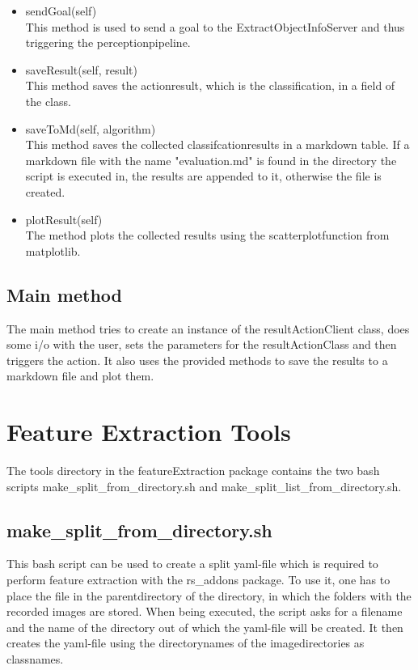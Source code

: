 \documentclass[main.tex]{subfiles}
\begin{document}
\begin{itemize}
\item 
sendGoal(self)\\
This method is used to send a goal to the ExtractObjectInfoServer and thus triggering the perceptionpipeline.

\item saveResult(self, result)\\
This method saves the actionresult, which is the classification, in a field of the class.

\item saveToMd(self, algorithm)\\
This method saves the collected classifcationresults in a markdown table. If a markdown file with the name "evaluation.md" is found in the directory the script is executed in, the results are appended to it, otherwise the file is created.

\item plotResult(self)\\
The method plots the collected results using the scatterplotfunction from matplotlib.
\end{itemize}

\subsection{Main method}
The main method tries to create an instance of the resultActionClient class, does some i/o with the user, sets the parameters for the resultActionClass and then triggers the action. It also uses the provided methods to save the results to a markdown file and plot them.

\section{Feature Extraction Tools}
The tools directory in the featureExtraction package contains the two bash scripts make\_split\_from\_directory.sh and make\_split\_list\_from\_directory.sh.

\subsection{make\_split\_from\_directory.sh} 
This bash script can be used to create a split yaml-file which is required to perform feature extraction with the rs\_addons package. To use it, one has to place the file in the parentdirectory of the directory, in which the folders with the recorded images are stored. When being executed, the script asks for a filename and the name of the directory out of which the yaml-file will be created. It then creates the yaml-file using the directorynames of the imagedirectories as classnames.
\end{document}
